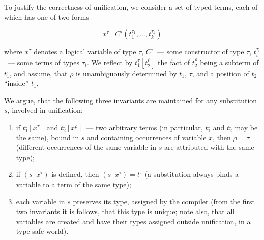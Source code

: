 \documentclass[10pt, oneside, nocopyrightspace]{sigplanconf}
\begin{document}
To justify the correctness of unification, we consider a set of typed terms, each of which
has one of two forms

$$
x^\tau \mid C^\tau(t_1^{\tau_1},\dots,t_k^{\tau_k})
$$

\noindent where $x^\tau$ denotes a logical variable of type $\tau$, 
$C^\tau$~--- some constructor of type $\tau$, $t_i^{\tau_i}$~--- some terms of types $\tau_i$.
We reflect by $t_1^\tau[t_2^\rho]$ the fact of $t_2^\rho$ being a subterm of $t_1^\tau$, and
assume, that $\rho$ is unambiguously determined by $t_1$, $\tau$, and a position of $t_2$ 
``inside'' $t_1$.

\begin{comment}
Outside unification the compiler maintains typing, which means, that all 
terms, subterms, and variables agree in their types in all contexts. However, as 
our implementation resorts to unsafe features, we have to make this work for unification
code on our own.
\end{comment}

We argue, that the following three invariants are maintained for any substitution $s$, involved 
in unification:

\begin{enumerate}
\item if \mbox{$t_1^{\_}[x^{\tau}]$} and \mbox{$t_2^{\_}[x^{\rho}]$}~--- two arbitrary terms (in particular, 
$t_1^{\_}$ and $t_2^{\_}$ may be the same), bound in $s$ and containing occurrences of variable $x$, 
then $\rho=\tau$ (different occurrences of the same variable in $s$ are attributed with the same type);

\item if \mbox{$(s\;\;x^\tau)$} is defined, then \mbox{$(s\;\;x^\tau) = t^\tau$} (a substitution always
binds a variable to a term of the same type);

\item each variable in $s$ preserves its type, assigned by the compiler (from the first two invariants 
it is follows, that this type is unique; note also, that all variables are created and have their 
types assigned outside unification, in a type-safe world).
\end{enumerate}
\end{document}
